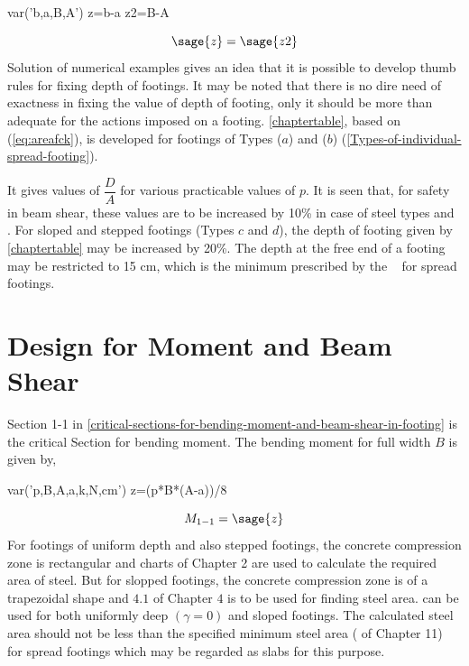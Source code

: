 \begin{sagesilent}                                                      
        var('b,a,B,A')                                                
        z=b-a
        z2=B-A                                                    
\end{sagesilent}

\begin{equation}
  \label{eq:equaloverhang}
           \sage{z}=\sage{z2} 
\end{equation}
Solution of numerical examples gives an idea that it is possible to develop
thumb rules for fixing depth of footings. It may be noted that there is no
dire need of exactness in fixing the value of depth of footing, only it
should be more than adequate for the actions imposed on a footing. \tablemacro \ref{chaptertable}, based on \equmacro (\ref{eq:areafck}), is developed for footings of Types ($a$) and
($b$) (\figmacro \ref{Types-of-individual-spread-footing}).

It gives values of $\dfrac{D}{A}$ for various practicable values of $p$. It
is seen that, for safety in beam shear, these values are to be increased by
10\% in case of steel types \Fefouronefivemacro and \Fefivezerozeromacro. For sloped and
stepped footings (Types $c$ and $d$), the depth of footing given by \tablemacro \ref{chaptertable}
may be increased by 20\%. The depth at the free end of a footing may be
restricted to 15 cm, which is the minimum prescribed by the ~ for spread
footings.
 



 \section{Design for Moment and Beam Shear} 
 Section 1-1 in \figmacro \ref{critical-sections-for-bending-moment-and-beam-shear-in-footing} is the critical  Section for bending moment. The bending moment
for full width $B$ is given by,

\begin{sagesilent}                                                      
        var('p,B,A,a,k,N,cm')                                                
        z=(p*B*(A-a))/8                                           
\end{sagesilent}  

\begin{equation}
        \label{eq:criticalMoment}
        M_{1-1}=\sage{z}
\end{equation}
For footings of uniform depth and also stepped footings, the concrete compression zone is
rectangular and charts of Chapter 2 are used to calculate the required area of steel. But for slopped footings, the concrete compression zone is of a trapezoidal shape and \chartmacro $4.1$ of Chapter $4$ is to be used for finding steel area. 
 can be used for both uniformly deep $(\gamma = 0)$ and sloped footings.
The calculated steel area should not be less than the 
speciﬁed minimum steel area ( of Chapter 11)
for spread footings which may be regarded as slabs for this purpose.

